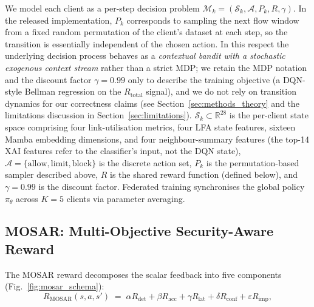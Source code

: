 \documentclass[ai,article,submit,moreauthors,pdftex]{Definitions/mdpi}
\newcommand{\rev}[1]{#1}
\begin{document}
\rev{We model each client as a per-step decision problem
$\mathcal{M}_k = (\mathcal{S}_k, \mathcal{A}, P_k, R, \gamma)$. In the released implementation, $P_k$ corresponds to sampling the next flow window from a fixed random permutation of the client's dataset at each step, so the transition is essentially independent of the chosen action. In this respect the underlying decision process behaves as a \emph{contextual bandit with a stochastic exogenous context stream} rather than a strict MDP; we retain the MDP notation and the discount factor $\gamma = 0.99$ only to describe the training objective (a DQN-style Bellman regression on the $R_{\text{total}}$ signal), and we do not rely on transition dynamics for our correctness claims (see Section~\ref{sec:methods_theory} and the limitations discussion in Section~\ref{sec:limitations}).}
$\mathcal{S}_k \subset \mathbb{R}^{\rev{28}}$ is the per-client state space
\rev{comprising four link-utilisation metrics, four LFA state features, sixteen Mamba embedding dimensions, and four neighbour-summary features (the top-14 XAI features refer to the classifier's input, not the DQN state)}, $\mathcal{A} = \{\text{allow},
\text{limit}, \text{block}\}$ is the discrete action set, $P_k$ is the
\rev{permutation-based sampler described above}, $R$ is the shared reward function
(defined below), and $\gamma = 0.99$ is the discount factor. Federated
training synchronises the global policy $\pi_\theta$ across $K = 5$
clients via parameter averaging\cite{mcmahan2017fedavg,li2020fedprox}.

\subsection{MOSAR: Multi-Objective Security-Aware
Reward}\label{sec:methods_mosar}

The MOSAR reward decomposes the scalar feedback into five components
(Fig.~\ref{fig:mosar_schema}):
\begin{equation}\label{eq:mosar}
R_{\text{MOSAR}}(s,a,s') \;=\;
  \alpha R_{\text{det}} +
  \beta  R_{\text{acc}} +
  \gamma R_{\text{lat}} +
  \delta R_{\text{conf}} +
  \varepsilon R_{\text{imp}},
\end{equation}
\end{document}
